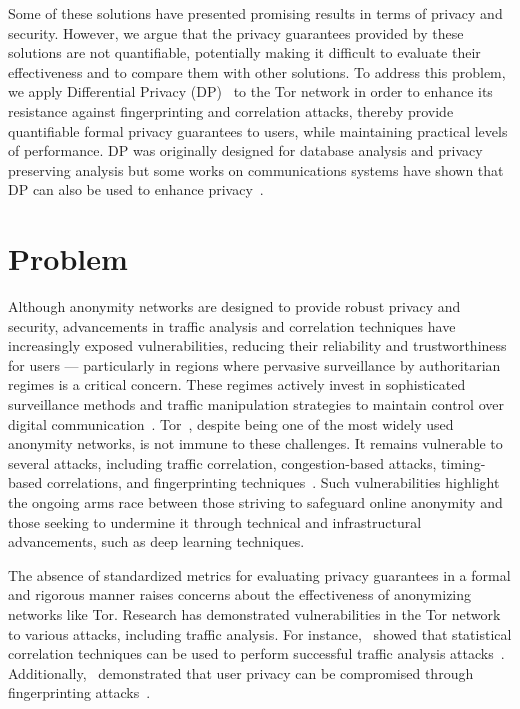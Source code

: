 Some of these solutions have presented promising results in terms of privacy and security. However, we argue that the privacy guarantees provided by these solutions are not quantifiable, potentially making it difficult to evaluate their effectiveness and to compare them with other solutions. To address this problem, we apply Differential Privacy (DP)~\cite*{DifPrivacy,DifPrivacyCalNoise,DP_Book} to the Tor network in order to enhance its resistance against fingerprinting and correlation attacks, thereby provide quantifiable formal privacy guarantees to users, while maintaining practical levels of performance. DP was originally designed for database analysis and privacy preserving analysis but some works on communications systems have shown that DP can also be used to enhance privacy~\cite*{Loopix, Stadium, VilalongaINForum, StatPrivStreaming, NetShaper}. 


\section{Problem}\label{sec:problem}
Although anonymity networks are designed to provide robust privacy and security, advancements in traffic analysis and correlation techniques have increasingly exposed vulnerabilities, reducing their reliability and trustworthiness for users — particularly in regions where pervasive surveillance by authoritarian regimes is a critical concern. These regimes actively invest in sophisticated surveillance methods and traffic manipulation strategies to maintain control over digital communication~\cite*{aryan2013internet, zittrain2017shifting, alimardani2018internet}.
Tor~\cite{dingledine2004tor}, despite being one of the most widely used anonymity networks, is not immune to these challenges. It remains vulnerable to several attacks, including traffic correlation, congestion-based attacks, timing-based correlations, and fingerprinting techniques~\cite*{chakravarty2014trafficanalysis, johnson2013users,winter2012great, robjansen2019dosontor}. Such vulnerabilities highlight the ongoing arms race between those striving to safeguard online anonymity and those seeking to undermine it through technical and infrastructural advancements, such as deep learning techniques.

The absence of standardized metrics for evaluating privacy guarantees in a formal and rigorous manner raises concerns about the effectiveness of anonymizing networks like Tor. Research has demonstrated vulnerabilities in the Tor network to various attacks, including traffic analysis. For instance,~\citeauthor{chakravarty2014trafficanalysis} showed that statistical correlation techniques can be used to perform successful traffic analysis attacks~\cite{chakravarty2014trafficanalysis}. Additionally,~\citeauthor{yi2009fingerprinting} demonstrated that user privacy can be compromised through fingerprinting attacks~\cite{yi2009fingerprinting}.

